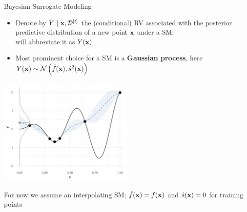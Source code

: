 \documentclass[11pt,compress,t,notes=noshow, xcolor=table]{beamer}
\begin{document}
\begin{vbframe}{Bayesian Surrogate Modeling}
\framebreak

\begin{itemize}
\item Denote by $Y~|~\mathbf{x}, \mathcal{D}^{[t]}$ the (conditional) RV associated with the posterior predictive distribution of a new point $\mathbf{x}$ under a SM;\\will abbreviate it as $Y(\mathbf{x})$
\item Most prominent choice for a SM is a \textbf{Gaussian process}, here $Y(\mathbf{x}) \sim \mathcal{N}\left(\hat{f}(\mathbf{x}), \hat{s}^2(\mathbf{x})\right)$
\end{itemize}
\vspace{-1em}
\begin{center}
  \includegraphics[width = 0.5\textwidth]{figure_man/bayesian_loop_sm_normal.png}
\end{center}
\begin{footnotesize}
    For now we assume an interpolating SM; $\hat{f}(\mathbf{x}) = f(\mathbf{x})$ and $\hat{s}(\mathbf{x}) = 0$ for training points\\
\end{footnotesize}

\end{vbframe} 
\end{document}
